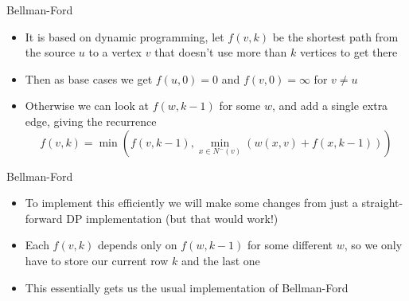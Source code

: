 \documentclass{beamer}
\newcommand\p[1]{\left(#1\right)}
\begin{document}
\begin{frame}[plain]{Bellman-Ford}
    \begin{itemize}
    \item It is based on dynamic programming, let $f(v, k)$ be the shortest path from the source $u$ to a vertex $v$ that doesn't use more than $k$ vertices to get there
    \item Then as base cases we get $f(u, 0) = 0$ and $f(v, 0) = \infty$ for $v \neq u$
    \item Otherwise we can look at $f(w, k - 1)$ for some $w$, and add a single extra edge, giving the recurrence
    \[f(v, k) = \min \p{ f(v, k - 1), \min_{x \in N^-(v)} \p{ w(x, v) + f(x, k - 1) } }\]
    \end{itemize}
\end{frame}

\begin{frame}[plain]{Bellman-Ford}
    \begin{itemize}
    \item To implement this efficiently we will make some changes from just a straight-forward DP implementation (but that would work!)
    \item Each $f(v, k)$ depends only on $f(w, k - 1)$ for some different $w$, so we only have to store our current row $k$ and the last one
    \item This essentially gets us the usual implementation of Bellman-Ford
    \end{itemize}
\end{frame}
\end{document}
